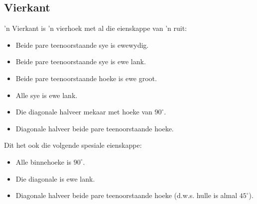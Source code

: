 \subsection{Vierkant}
'n Vierkant is 'n vierhoek met al die eienskappe van 'n ruit:

\begin{itemize}[noitemsep]
\item Beide pare teenoorstaande sye is ewewydig.
\item Beide pare teenoorstaande sye is ewe lank.

\item Beide pare teenoorstaande hoeke is ewe groot.

\item Alle sye is ewe lank.

\item Die diagonale halveer mekaar met hoeke van ${90}^{\circ }$.
\item Diagonale halveer beide pare teenoorstaande hoeke.  

\end{itemize}
Dit het ook die volgende spesiale eienskappe:
\begin{itemize}[noitemsep]
\item Alle binnehoeke is ${90}^{\circ}$.
\item Die diagonale is ewe lank.
\item Diagonale halveer beide pare teenoorstaande hoeke (d.w.s. hulle is almal ${45}^{\circ }$).
\end{itemize}

